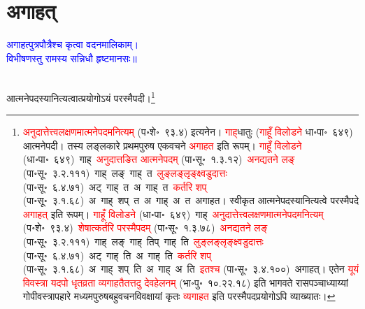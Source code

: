 \section[अगाहत्]{अगाहत्}
\centering\textcolor{blue}{अगाहत्पुत्रपौत्रैश्च कृत्वा वदनमालिकाम्।\nopagebreak\\
विभीषणस्तु रामस्य सन्निधौ हृष्टमानसः॥}\nopagebreak\\
\\
\fontsize{14}{21}\selectfont\begin{sloppypar}\justifying\noindent\hspace{10mm} आत्मनेपदस्यानित्यत्वात्प्रयोगोऽयं परस्मैपदी।\footnote{\textcolor{red}{अनुदात्तेत्त्व\-लक्षणमात्मने\-पदमनित्यम्} (प॰शे॰~९३.४) इत्यनेन। \textcolor{red}{गाह्‌}\-धातुः (\textcolor{red}{गाहूँ विलोडने} धा॰पा॰~६४९) आत्मने\-पदी। तस्य लङ्लकारे प्रथमपुरुष एकवचने \textcolor{red}{अगाहत} इति रूपम्। \textcolor{red}{गाहूँ विलोडने} (धा॰पा॰~६४९)~\arrow गाह्~\arrow \textcolor{red}{अनुदात्तङित आत्मने\-पदम्} (पा॰सू॰~१.३.१२)~\arrow \textcolor{red}{अनद्यतने लङ्} (पा॰सू॰~३.२.१११)~\arrow गाह्~लङ्~\arrow गाह्~त~\arrow \textcolor{red}{लुङ्लङ्लृङ्क्ष्वडुदात्तः} (पा॰सू॰~६.४.७१)~\arrow अट्~गाह्~त~\arrow अ~गाह्~त~\arrow \textcolor{red}{कर्तरि शप्‌} (पा॰सू॰~३.१.६८)~\arrow अ~गाह्~शप्~त~\arrow अ~गाह्~अ~त~\arrow अगाहत। स्वीकृत आत्मने\-पदस्यानित्यत्वे परस्मैपदे \textcolor{red}{अगाहत्} इति रूपम्। \textcolor{red}{गाहूँ विलोडने} (धा॰पा॰~६४९)~\arrow गाह्~\arrow \textcolor{red}{अनुदात्तेत्त्व\-लक्षणमात्मने\-पदमनित्यम्} (प॰शे॰~९३.४)~\arrow \textcolor{red}{शेषात्कर्तरि परस्मैपदम्} (पा॰सू॰~१.३.७८)~\arrow \textcolor{red}{अनद्यतने लङ्} (पा॰सू॰~३.२.१११)~\arrow गाह्~लङ्~\arrow गाह्~तिप्~\arrow गाह्~ति~\arrow \textcolor{red}{लुङ्लङ्लृङ्क्ष्वडुदात्तः} (पा॰सू॰~६.४.७१)~\arrow अट्~गाह्~ति~\arrow अ~गाह्~ति~\arrow \textcolor{red}{कर्तरि शप्‌} (पा॰सू॰~३.१.६८)~\arrow अ~गाह्~शप्~ति~\arrow अ~गाह्~अ~ति~\arrow \textcolor{red}{इतश्च} (पा॰सू॰~३.४.१००)~\arrow अगाहत्। एतेन \textcolor{red}{यूयं विवस्त्रा यदपो धृतव्रता व्यगाहतैतत्तदु देवहेलनम्} (भा॰पु॰~१०.२२.१८) इति भागवते रासपञ्चाध्याय्यां गोपीवस्त्रापहारे मध्यमपुरुष\-बहुवचन\-विवक्षायां कृतः \textcolor{red}{व्यगाहत} इति परस्मैपदप्रयोगोऽपि व्याख्यातः।}\end{sloppypar}
